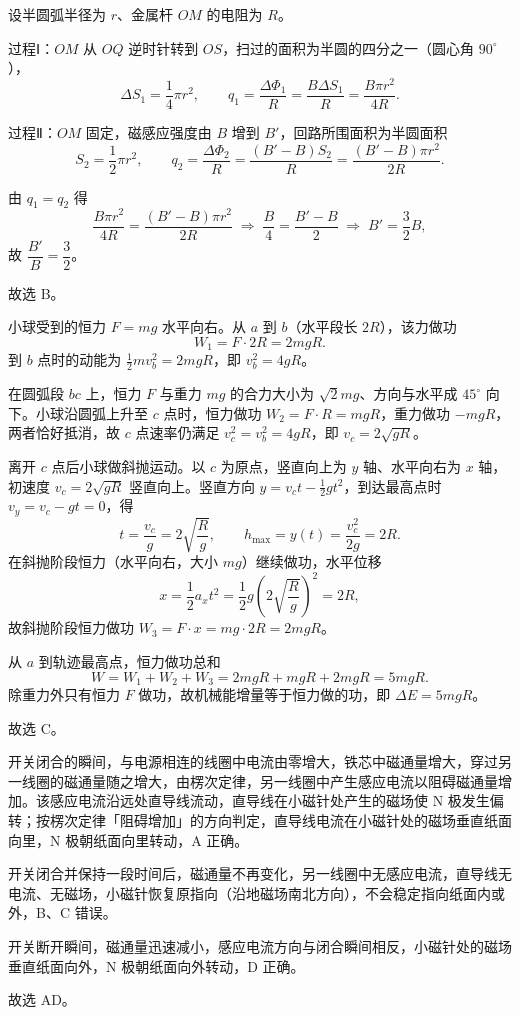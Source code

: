 \begin{answer}
设半圆弧半径为 $r$、金属杆 $OM$ 的电阻为 $R$。

过程Ⅰ：$OM$ 从 $OQ$ 逆时针转到 $OS$，扫过的面积为半圆的四分之一（圆心角 $90^{\circ}$），
\[
  \Delta S_{1}=\frac{1}{4}\pi r^{2},\qquad
  q_{1}=\frac{\Delta\Phi_{1}}{R}=\frac{B\Delta S_{1}}{R}=\frac{B\pi r^{2}}{4R}.
\]

过程Ⅱ：$OM$ 固定，磁感应强度由 $B$ 增到 $B'$，回路所围面积为半圆面积
\[
  S_{2}=\frac{1}{2}\pi r^{2},\qquad
  q_{2}=\frac{\Delta\Phi_{2}}{R}=\frac{(B'-B)S_{2}}{R}=\frac{(B'-B)\pi r^{2}}{2R}.
\]

由 $q_{1}=q_{2}$ 得
\[
  \frac{B\pi r^{2}}{4R}=\frac{(B'-B)\pi r^{2}}{2R}
  \;\Longrightarrow\;
  \frac{B}{4}=\frac{B'-B}{2}
  \;\Longrightarrow\;
  B'=\frac{3}{2}B,
\]
故 $\dfrac{B'}{B}=\dfrac{3}{2}$。

故选 B。
\end{answer}

\begin{answer}
小球受到的恒力 $F=mg$ 水平向右。从 $a$ 到 $b$（水平段长 $2R$），该力做功
\[
  W_{1}=F\cdot 2R=2mgR .
\]
到 $b$ 点时的动能为 $\frac{1}{2}mv_{b}^{2}=2mgR$，即 $v_{b}^{2}=4gR$。

在圆弧段 $bc$ 上，恒力 $F$ 与重力 $mg$ 的合力大小为 $\sqrt{2}mg$、方向与水平成 $45^{\circ}$ 向下。小球沿圆弧上升至 $c$ 点时，恒力做功 $W_{2}=F\cdot R=mgR$，重力做功 $-mgR$，两者恰好抵消，故 $c$ 点速率仍满足 $v_{c}^{2}=v_{b}^{2}=4gR$，即 $v_{c}=2\sqrt{gR}$。

离开 $c$ 点后小球做斜抛运动。以 $c$ 为原点，竖直向上为 $y$ 轴、水平向右为 $x$ 轴，初速度 $v_{c}=2\sqrt{gR}$ 竖直向上。竖直方向 $y=v_{c}t-\frac{1}{2}gt^{2}$，到达最高点时 $v_{y}=v_{c}-gt=0$，得
\[
  t=\frac{v_{c}}{g}=2\sqrt{\frac{R}{g}},\qquad
  h_{\max}=y(t)=\frac{v_{c}^{2}}{2g}=2R .
\]
在斜抛阶段恒力（水平向右，大小 $mg$）继续做功，水平位移
\[
  x=\frac{1}{2}a_{x}t^{2}=\frac{1}{2}g\left(2\sqrt{\frac{R}{g}}\right)^{2}=2R,
\]
故斜抛阶段恒力做功 $W_{3}=F\cdot x=mg\cdot 2R=2mgR$。

从 $a$ 到轨迹最高点，恒力做功总和
\[
  W=W_{1}+W_{2}+W_{3}=2mgR+mgR+2mgR=5mgR .
\]
除重力外只有恒力 $F$ 做功，故机械能增量等于恒力做的功，即 $\Delta E=5mgR$。

故选 C。
\end{answer}

\begin{answer}
开关闭合的瞬间，与电源相连的线圈中电流由零增大，铁芯中磁通量增大，穿过另一线圈的磁通量随之增大，由楞次定律，另一线圈中产生感应电流以阻碍磁通量增加。该感应电流沿远处直导线流动，直导线在小磁针处产生的磁场使 N 极发生偏转；按楞次定律「阻碍增加」的方向判定，直导线电流在小磁针处的磁场垂直纸面向里，N 极朝纸面向里转动，A 正确。

开关闭合并保持一段时间后，磁通量不再变化，另一线圈中无感应电流，直导线无电流、无磁场，小磁针恢复原指向（沿地磁场南北方向），不会稳定指向纸面内或外，B、C 错误。

开关断开瞬间，磁通量迅速减小，感应电流方向与闭合瞬间相反，小磁针处的磁场垂直纸面向外，N 极朝纸面向外转动，D 正确。

故选 AD。
\end{answer}

